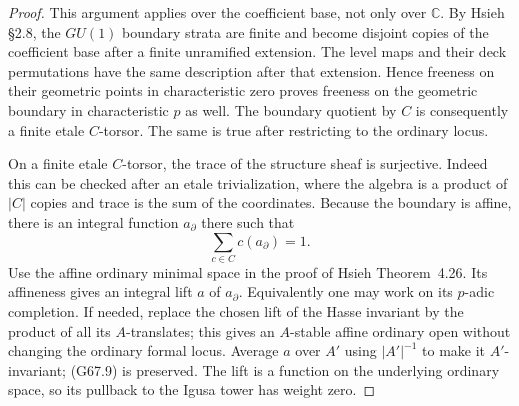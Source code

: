 \begin{proof}
This argument applies over the coefficient base, not only
over $\mathbb C$.  By Hsieh \S2.8, the $GU(1)$ boundary
strata are finite and become disjoint copies of the
coefficient base after a finite unramified extension.  The
level maps and their deck permutations have the same
description after that extension.  Hence freeness on their
geometric points in characteristic zero proves freeness on
the geometric boundary in characteristic $p$ as well.  The
boundary quotient by $C$ is consequently a finite etale
$C$-torsor.  The same is true after restricting to the
ordinary locus.

On a finite etale $C$-torsor, the trace of the structure
sheaf is surjective.  Indeed this can be checked after an
etale trivialization, where the algebra is a product of
$|C|$ copies and trace is the sum of the coordinates.
Because the boundary is affine, there is an integral
function $a_\partial$ there such that
\[
                    \sum_{c\in C}c(a_\partial)=1.          \tag{G67.9}
\]
Use the affine ordinary minimal space in the proof of
Hsieh Theorem~4.26.  Its affineness gives an integral lift
$a$ of $a_\partial$.  Equivalently one may work on its
$p$-adic completion.  If needed, replace the chosen lift of
the Hasse invariant by the product of all its $A$-translates;
this gives an $A$-stable affine ordinary open without
changing the ordinary formal locus.
Average $a$ over $A'$ using $|A'|^{-1}$ to make it
$A'$-invariant; (G67.9) is preserved.  The lift is a function
on the underlying ordinary space, so its pullback to the
Igusa tower has weight zero.


\end{proof}
